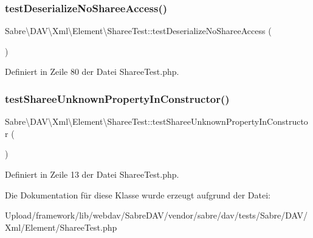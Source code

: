 \subsubsection{\texorpdfstring{test\+Deserialize\+No\+Sharee\+Access()}{testDeserializeNoShareeAccess()}}
{\footnotesize\ttfamily Sabre\textbackslash{}\+D\+A\+V\textbackslash{}\+Xml\textbackslash{}\+Element\textbackslash{}\+Sharee\+Test\+::test\+Deserialize\+No\+Sharee\+Access (\begin{DoxyParamCaption}{ }\end{DoxyParamCaption})}



Definiert in Zeile 80 der Datei Sharee\+Test.\+php.

\mbox{\label{class_sabre_1_1_d_a_v_1_1_xml_1_1_element_1_1_sharee_test_ab0365923b667b3d8addc3da871885081}} 
\subsubsection{\texorpdfstring{test\+Sharee\+Unknown\+Property\+In\+Constructor()}{testShareeUnknownPropertyInConstructor()}}
{\footnotesize\ttfamily Sabre\textbackslash{}\+D\+A\+V\textbackslash{}\+Xml\textbackslash{}\+Element\textbackslash{}\+Sharee\+Test\+::test\+Sharee\+Unknown\+Property\+In\+Constructor (\begin{DoxyParamCaption}{ }\end{DoxyParamCaption})}



Definiert in Zeile 13 der Datei Sharee\+Test.\+php.



Die Dokumentation für diese Klasse wurde erzeugt aufgrund der Datei\+:\begin{DoxyCompactItemize}
\item 
Upload/framework/lib/webdav/\+Sabre\+D\+A\+V/vendor/sabre/dav/tests/\+Sabre/\+D\+A\+V/\+Xml/\+Element/Sharee\+Test.\+php\end{DoxyCompactItemize}
